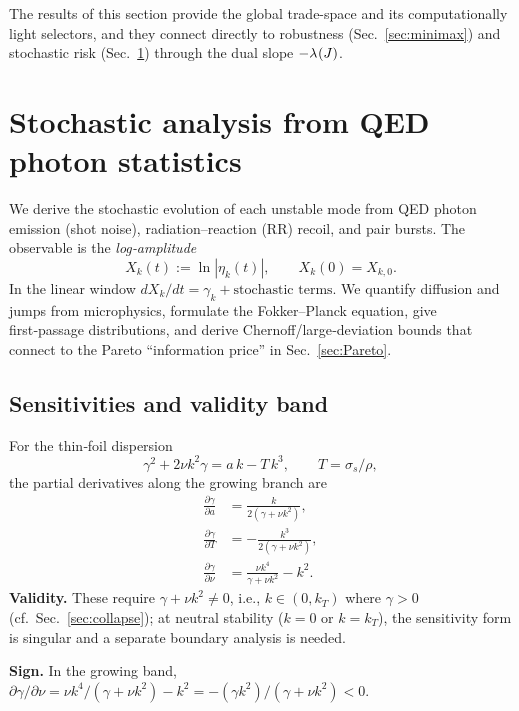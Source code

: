 \documentclass[aps,pre,twocolumn,showpacs,superscriptaddress]{revtex4-2}
\theoremstyle{definition}
\begin{document}
\medskip
The results of this section provide the global trade-space and its computationally light selectors, and they connect directly to robustness (Sec.~\ref{sec:minimax}) and stochastic risk (Sec.~\ref{sec:stochastic}) through the dual slope $-\lambda^{\*}(J)$.



\section{Stochastic analysis from QED photon statistics}\label{sec:stochastic}

We derive the stochastic evolution of each unstable mode from QED photon emission (shot noise), radiation–reaction (RR) recoil, and pair bursts. The observable is the \emph{log‑amplitude}
\begin{equation}\label{eq:Xk6}
X_k(t):=\ln|\eta_k(t)|,\qquad X_k(0)=X_{k,0}.
\end{equation}
In the linear window $dX_k/dt=\gamma_k+\text{stochastic terms}$. We quantify diffusion and jumps from microphysics, formulate the Fokker–Planck equation, give first‑passage distributions, and derive Chernoff/large‑deviation bounds that connect to the Pareto ``information price'' in Sec.~\ref{sec:Pareto}.

\subsection{Sensitivities and validity band}\label{subsec:sens6}

For the thin‑foil dispersion
\[
\gamma^2+2\nu k^2\gamma = a\,k - T\,k^3,\qquad T=\sigma_s/\rho,
\]
the partial derivatives along the growing branch are
\begin{align}\label{eq:sens6}
\frac{\partial \gamma}{\partial a}&=\frac{k}{2(\gamma+\nu k^2)},\\
\frac{\partial \gamma}{\partial T}&=-\frac{k^3}{2(\gamma+\nu k^2)},\\
\frac{\partial \gamma}{\partial \nu}&=\frac{\nu k^4}{\gamma+\nu k^2}-k^2.
\end{align}
\textbf{Validity.} These require $\gamma+\nu k^2\neq 0$, i.e., $k\in(0,k_T)$ where $\gamma>0$ (cf.\ Sec.~\ref{sec:collapse}); at neutral stability ($k=0$ or $k=k_T$), the sensitivity form is singular and a separate boundary analysis is needed.

\noindent\textbf{Sign.} In the growing band, $\partial\gamma/\partial\nu=\nu k^4/(\gamma+\nu k^2)-k^2=-(\gamma k^2)/(\gamma+\nu k^2)<0$.
\end{document}
